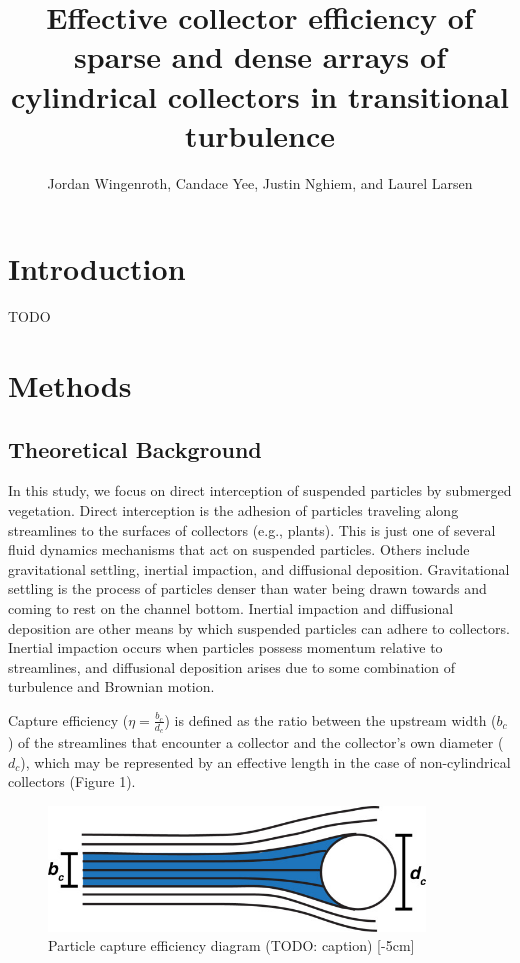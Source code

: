 \documentclass[parskip=full-]{scrreprt}
\author{Jordan Wingenroth, Candace Yee, Justin Nghiem, and Laurel Larsen}
\title{Effective collector efficiency of sparse and dense arrays of cylindrical collectors in transitional turbulence}
\begin{document}
\maketitle

\chapter{Introduction}

TODO

\chapter{Methods}

\section{Theoretical Background}

In this study, we focus on direct interception of suspended particles by submerged vegetation. Direct interception is the adhesion of particles traveling along streamlines to the surfaces of collectors (e.g., plants). This is just one of several fluid dynamics mechanisms that act on suspended particles. Others include gravitational settling, inertial impaction, and diffusional deposition. Gravitational settling is the process of particles denser than water being drawn towards and coming to rest on the channel bottom. Inertial impaction and diffusional deposition are other means by which suspended particles can adhere to collectors. Inertial impaction occurs when particles possess momentum relative to streamlines, and diffusional deposition arises due to some combination of turbulence and Brownian motion.

Capture efficiency ($\eta=\frac{b_c}{d_c}$) is defined as the ratio between the upstream width ($b_c$) of the streamlines that encounter a collector and the collector's own diameter (\(d_c\)), which may be represented by an effective length in the case of non-cylindrical collectors (Figure 1).

\begin{figure}[htbp]
\includegraphics[width=10cm]{fauria particle capture efficiency diagram.jpg}
\centering
\caption[xxx]{Particle capture efficiency diagram (TODO: caption) [-5cm]}
\end{figure}
\end{document}
